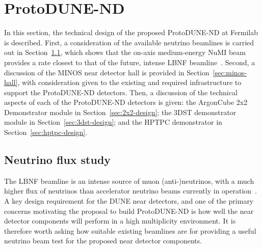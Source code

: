 \section{ProtoDUNE-ND}
\label{sec:protodune-nd}
In this section, the technical design of the proposed ProtoDUNE-ND at Fermilab is described. First, a consideration of the available neutrino beamlines is carried out in Section~\ref{sec:neutrino-flux}, which shows that the on-axis medium-energy NuMI beam provides a rate closest to that of the future, intense LBNF beamline~\cite{DUNE3}. Second, a discussion of the MINOS near detector hall is provided in Section~\ref{sec:minos-hall}, with consideration given to the existing and required infrastructure to support the ProtoDUNE-ND detectors. Then, a discussion of the technical aspects of each of the ProtoDUNE-ND detectors is given: the ArgonCube 2x2 Demonstrator module in Section~\ref{sec:2x2-design}; the 3DST demonstrator module in Section~\ref{sec:3dst-design}; and the HPTPC demonstrator in Section~\ref{sec:hptpc-design}. 

\subsection{Neutrino flux study}
\label{sec:neutrino-flux}
The LBNF beamline is an intense source of muon (anti-)neutrinos, with a much higher flux of neutrinos than accelerator neutrino beams currently in operation~\cite{DUNE3}. A key design requirement for the DUNE near detectors, and one of the primary concerns motivating the proposal to build ProtoDUNE-ND is how well the near detector components will perform in a high multiplicity environment. It is therefore worth asking how suitable existing beamlines are for providing a useful neutrino beam test for the proposed near detector components.

